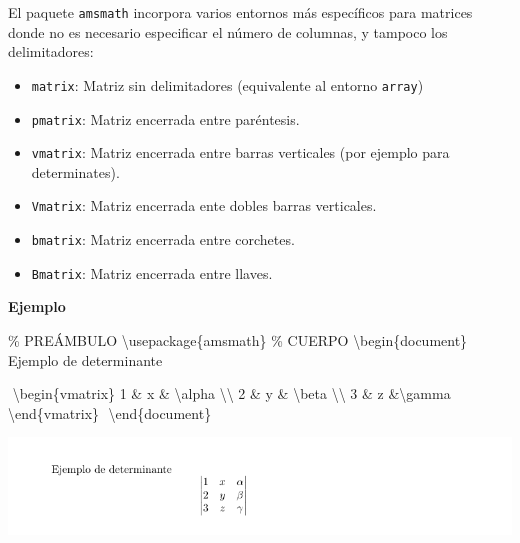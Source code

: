 \documentclass[
  a4paper,
]{scrreport}
\newenvironment{Shaded}{\begin{snugshade}}{\end{snugshade}}
\newcommand{\BuiltInTok}[1]{\textcolor[rgb]{0.00,0.23,0.31}{#1}}
\newcommand{\CommentTok}[1]{\textcolor[rgb]{0.37,0.37,0.37}{#1}}
\newcommand{\ExtensionTok}[1]{\textcolor[rgb]{0.00,0.23,0.31}{#1}}
\newcommand{\KeywordTok}[1]{\textcolor[rgb]{0.00,0.23,0.31}{#1}}
\newcommand{\NormalTok}[1]{\textcolor[rgb]{0.00,0.23,0.31}{#1}}
\newcommand{\SpecialCharTok}[1]{\textcolor[rgb]{0.37,0.37,0.37}{#1}}
\newcommand{\SpecialStringTok}[1]{\textcolor[rgb]{0.13,0.47,0.30}{#1}}
\providecommand{\tightlist}{%
  \setlength{\itemsep}{0pt}\setlength{\parskip}{0pt}}\usepackage{longtable,booktabs,array}
\begin{document}
El paquete \texttt{amsmath} incorpora varios entornos más específicos
para matrices donde no es necesario especificar el número de columnas, y
tampoco los delimitadores:

\begin{itemize}
\tightlist
\item
  \texttt{matrix}: Matriz sin delimitadores (equivalente al entorno
  \texttt{array})
\item
  \texttt{pmatrix}: Matriz encerrada entre paréntesis.
\item
  \texttt{vmatrix}: Matriz encerrada entre barras verticales (por
  ejemplo para determinates).
\item
  \texttt{Vmatrix}: Matriz encerrada ente dobles barras verticales.
\item
  \texttt{bmatrix}: Matriz encerrada entre corchetes.
\item
  \texttt{Bmatrix}: Matriz encerrada entre llaves.
\end{itemize}

\textbf{Ejemplo}

\begin{Shaded}
\begin{Highlighting}[]
\CommentTok{\% PREÁMBULO}
\BuiltInTok{\textbackslash{}usepackage}\NormalTok{\{}\ExtensionTok{amsmath}\NormalTok{\}}
\CommentTok{\% CUERPO}
\KeywordTok{\textbackslash{}begin}\NormalTok{\{}\ExtensionTok{document}\NormalTok{\}}
\NormalTok{Ejemplo de determinante}

\SpecialStringTok{$$}
\KeywordTok{\textbackslash{}begin}\NormalTok{\{}\ExtensionTok{vmatrix}\NormalTok{\}}
\SpecialStringTok{1 \& x \& }\SpecialCharTok{\textbackslash{}alpha}\SpecialStringTok{ }\SpecialCharTok{\textbackslash{}\textbackslash{}}
\SpecialStringTok{2 \& y \& }\SpecialCharTok{\textbackslash{}beta}\SpecialStringTok{ }\SpecialCharTok{\textbackslash{}\textbackslash{}}
\SpecialStringTok{3 \& z \&}\SpecialCharTok{\textbackslash{}gamma}
\KeywordTok{\textbackslash{}end}\NormalTok{\{}\ExtensionTok{vmatrix}\NormalTok{\}}
\SpecialStringTok{$$}
\KeywordTok{\textbackslash{}end}\NormalTok{\{}\ExtensionTok{document}\NormalTok{\}}
\end{Highlighting}
\end{Shaded}

\begin{tcolorbox}[enhanced jigsaw, bottomrule=.15mm, leftrule=.75mm, opacityback=0, titlerule=0mm, bottomtitle=1mm, colbacktitle=quarto-callout-note-color!10!white, arc=.35mm, toprule=.15mm, colframe=quarto-callout-note-color-frame, title={Salida}, coltitle=black, colback=white, breakable, toptitle=1mm, rightrule=.15mm, left=2mm, opacitybacktitle=0.6]

\includegraphics{./img/formulas/determinante.png}

\end{tcolorbox}
\end{document}
